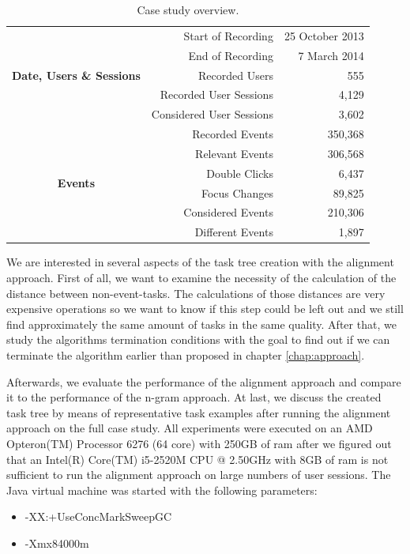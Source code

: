 \begin{table}
	\centering
	\begin{tabular}{c r r}
		\toprule
		\multirow{5}{*}{\textbf{Date, Users \& Sessions}} & Start of Recording & 25 October 2013 \\
		      & End of Recording & 7 March 2014 \\
		      & Recorded Users & 555 \\
		      & Recorded User Sessions & 4,129 \\
		      & Considered User Sessions & 3,602 \\
		\midrule
		\multirow{6}{*}{\textbf{Events}} & Recorded Events & 350,368 \\
		      & Relevant Events & 306,568 \\
		      & Double Clicks & 6,437 \\
		      & Focus Changes & 89,825 \\
			   & Considered Events & 210,306 \\
			   & Different Events & 1,897 \\
		\bottomrule
	\end{tabular}
	\caption{Case study overview.}
	\label{tab:casestudy2}
\end{table}

We are interested in several aspects of the task tree creation with the alignment approach.
First of all, we want to examine the necessity of the calculation of the distance between non-event-tasks.
The calculations of those distances are very expensive operations so we want to know if this step could be left out and we still find approximately the same amount of tasks in the same quality.
After that, we study the algorithms termination conditions with the goal to find out if we can terminate the algorithm earlier than proposed in chapter \ref{chap:approach}.

Afterwards, we evaluate the performance of the alignment approach and compare it to the performance of the n-gram approach.
At last, we discuss the created task tree by means of representative task examples after running the alignment approach on the full case study.
All experiments were executed on an AMD Opteron(TM) Processor 6276 (64 core) with 250GB of ram after we figured out that an Intel(R) Core(TM) i5-2520M CPU @ 2.50GHz with 8GB of ram is not sufficient to run the alignment approach on large numbers of user sessions.
The Java virtual machine was started with the following parameters:
\begin{itemize}
	\item -XX:+UseConcMarkSweepGC
	\item -Xmx84000m
\end{itemize}

